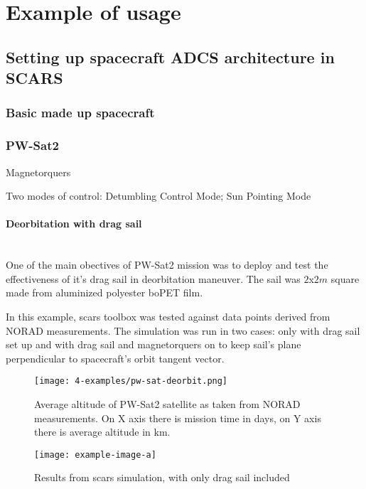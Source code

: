 \section{Example of usage}\label{sec:examples}

\subsection{Setting up spacecraft ADCS architecture in SCARS}

\subsubsection{Basic made up spacecraft}

\subsubsection{PW-Sat2}
    Magnetorquers

    Two modes of control: Detumbling Control Mode; Sun Pointing Mode

    \paragraph*{Deorbitation with drag sail}\hspace{0pt} \\
        One of the main obectives of PW-Sat2 mission was to deploy and test the effectiveness of it's drag sail in deorbitation maneuver. The sail was  $2$x$2m$ square made from aluminized polyester boPET film.\cite{pwsat2dt}
        
        In this example, \ac{scars} toolbox was tested against data points derived from NORAD measurements. The simulation was run in two cases: only with drag sail set up and with drag sail and magnetorquers on to keep sail's plane perpendicular to spacecraft's orbit tangent vector.
         
        \begin{figure}[H]
            \centering
            \texttt{[image: 4-examples/pw-sat-deorbit.png]}
            \caption{Average altitude of PW-Sat2 satellite as taken from NORAD measurements. On X axis there is mission time in days, on Y axis there is average altitude in km.}
            \label{fig:pw-sat-deorbit}
        \end{figure}
         
        \begin{figure}[H]
            \centering
            \texttt{[image: example-image-a]}
            \caption{Results from \ac{scars} simulation, with only drag sail included}
            \label{fig:scars-deorbit}
        \end{figure}
         
